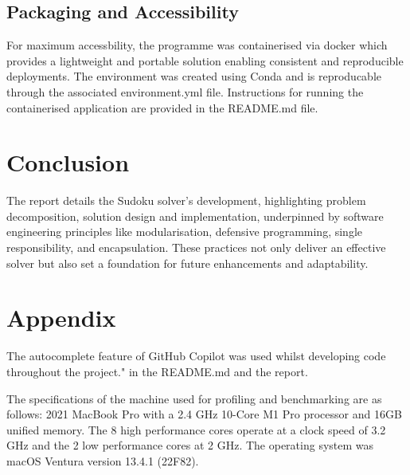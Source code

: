 \documentclass[11pt]{article}
\begin{document}
\subsection{Packaging and Accessibility}
For maximum accessbility, the programme was containerised via docker which provides a lightweight and portable solution enabling consistent and reproducible deployments. The environment was created using Conda and is reproducable through the associated environment.yml file. Instructions for running the containerised application are provided in the README.md file.

\section{Conclusion}
The report details the Sudoku solver's development, highlighting problem decomposition, solution design and implementation, underpinned by software engineering principles like modularisation, defensive programming, single responsibility, and encapsulation. These practices not only deliver an effective solver but also set a foundation for future enhancements and adaptability.

\section{Appendix}
The autocomplete feature of GitHub Copilot was used whilst developing code throughout the project."
in the README.md and the report.

The specifications of the machine used for profiling and benchmarking are as follows:
2021 MacBook Pro with a 2.4 GHz 10-Core M1 Pro processor and
16GB unified memory. The 8 high performance cores operate at a clock speed of 3.2 GHz and the 2
low performance cores at 2 GHz. The operating system was macOS Ventura version 13.4.1 (22F82).



\end{document}
